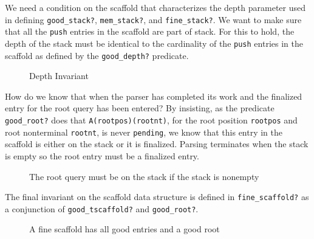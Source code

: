 \documentclass[sigplan,10pt,anonymous,review]{acmart}\settopmatter{printfolios=true,printccs=false,printacmref=false}
\begin{document}
\begin{CCSXML}
We need a condition on the scaffold that characterizes the depth parameter used in defining \texttt{good\_stack?}, \texttt{mem\_stack?}, and \texttt{fine\_stack?}\@.  We want to make sure that all the   \texttt{push} entries in the scaffold are part of stack.  For this to hold, the depth of the stack must be identical to the cardinality of the \texttt{push} entries in the scaffold as defined by the
\texttt{good\_depth?} predicate. 

\begin{figure}[h!]
  
    \vspace*{-4mm}
\caption{Depth Invariant}
\label{pvs:gooddepth}
\end{figure}

How do we know that when the parser has completed its work and the finalized entry
for the root query has been entered?  By insisting, as the predicate
\texttt{good\_root?} does that \texttt{A(rootpos)(rootnt)}, for
the root position \texttt{rootpos} and root nonterminal \texttt{rootnt},
is never \texttt{pending}, we know that this entry in the scaffold is either on the stack or it is finalized.  Parsing terminates when the stack is empty so the
root entry must be a finalized entry.  

\begin{figure}[h!]
  
    \vspace*{-4mm}
\caption{The root query must be on the stack if the stack is nonempty}
\label{pvs:goodroot}
\end{figure}

The final invariant on the scaffold data structure is defined in
\texttt{fine\_scaffold?} as a conjunction of \texttt{good\_tscaffold?}
and \texttt{good\_root?}\@.  
\begin{figure}[h!]
  
    \vspace*{-4mm}
\caption{A fine scaffold has all good entries and a good root}
\label{pvs:finescaffold}
\end{figure}


\end{CCSXML}
\end{document}
